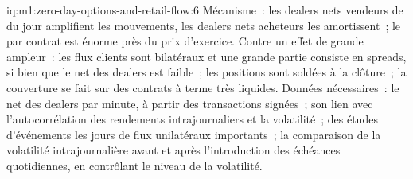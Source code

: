 \begin{solution}{iq:m1:zero-day-options-and-retail-flow:6}
Mécanisme~: les dealers nets vendeurs de  du jour amplifient les mouvements, les dealers nets
acheteurs les amortissent~; le  par contrat est énorme près du prix d'exercice. Contre un effet
de grande ampleur~: les flux clients sont bilatéraux et une grande partie consiste en spreads, si bien que le
 net des dealers est faible~; les positions sont soldées à la clôture~; la couverture se fait
sur des contrats à terme très liquides. Données nécessaires~: le  net des dealers par minute, à partir des
transactions signées~; son lien avec l'autocorrélation des rendements intrajournaliers et la volatilité~;
des études d'événements les jours de flux unilatéraux importants~; la comparaison de la volatilité
intrajournalière avant et après l'introduction des échéances quotidiennes, en contrôlant le
niveau de la volatilité.
\end{solution}
